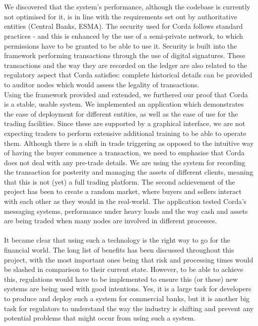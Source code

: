 \documentclass[12pt,twoside]{article}
\begin{document}
\\ \\
We discovered that the system's performance, although the codebase is currently not optimised for it, is in line with the requirements set out by authoritative entities (Central Banks, ESMA). The security used for Corda follows standard practices - and this is enhanced by the use of a semi-private network, to which permissions have to be granted to be able to use it. Security is built into the framework performing transactions through the use of digital signatures. These transactions and the way they are recorded on the ledger are also related to the regulatory aspect that Corda satisfies: complete historical details can be provided to auditor nodes which would assess the legality of transactions.
\\
Using the framework provided and extended, we furthered our proof that Corda is a stable, usable system. We implemented an application which demonstrates the ease of deployment for different entities, as well as the ease of use for the trading facilities. Since these are supported by a graphical interface, we are not expecting traders to perform extensive additional training to be able to operate them. Although there is a shift in trade triggering as opposed to the intuitive way of having the buyer commence a transaction, we need to emphasise that Corda does not deal with any pre-trade details. We are using the system for recording the transaction for posterity and managing the assets of different clients, meaning that this is not (yet) a full trading platform. The second achievement of the project has been to create a random market, where buyers and sellers interact with each other as they would in the real-world. The application tested Corda's messaging systems, performance under heavy loads and the way cash and assets are being traded when many nodes are involved in different processes.
\\ \\
It became clear that using such a technology is the right way to go for the financial world. The long list of benefits has been discussed throughout this project, with the most important ones being that risk and processing times would be slashed in comparison to their current state. However, to be able to achieve this, regulations would have to be implemented to ensure this (or these) new systems are being used with good intentions. Yes, it is a large task for developers to produce and deploy such a system for commercial banks, but it is another big task for regulators to understand the way the industry is shifting and prevent any potential problems that might occur from using such a system.
\end{document}
